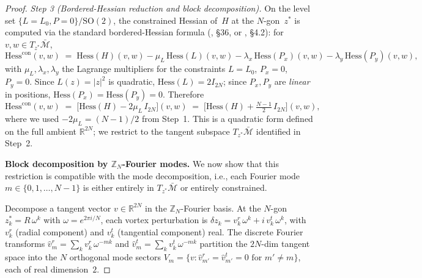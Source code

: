 \begin{proof}
\emph{Step 3 (Bordered-Hessian reduction and block decomposition).}
On the level set $\{L = L_0, P = 0\}/\mathrm{SO}(2)$, the
constrained Hessian of~$H$ at the $N$-gon~$z^*$ is computed via
the standard bordered-Hessian formula (\citealt{Arnold1978},
\S36, or \citealt{MarsdenRatiu1999}, \S4.2): for $v, w \in
T_{z^*}\bar{\mathcal{M}}$,
\begin{equation}\label{eq:bordered-hess}
  \mathrm{Hess}^{\mathrm{con}}(v, w)
  \;=\; \mathrm{Hess}(H)(v, w)
     - \mu_L \,\mathrm{Hess}(L)(v, w)
     - \lambda_x\,\mathrm{Hess}(P_x)(v, w)
     - \lambda_y\,\mathrm{Hess}(P_y)(v, w),
\end{equation}
with $\mu_L, \lambda_x, \lambda_y$ the Lagrange multipliers for
the constraints $L = L_0$, $P_x = 0$, $P_y = 0$.  Since
$L(z) = |z|^2$ is quadratic, $\mathrm{Hess}(L) = 2 I_{2N}$; since
$P_x, P_y$ are \emph{linear} in positions,
$\mathrm{Hess}(P_x) = \mathrm{Hess}(P_y) = 0$.  Therefore
\begin{equation}\label{eq:constrained-hess}
  \mathrm{Hess}^{\mathrm{con}}(v, w)
  \;=\; \bigl[\mathrm{Hess}(H) - 2\mu_L\,I_{2N}\bigr](v, w)
  \;=\; \bigl[\mathrm{Hess}(H) + \tfrac{N-1}{2}\,I_{2N}\bigr](v, w),
\end{equation}
where we used $-2\mu_L = (N-1)/2$ from Step~1.  This is a
quadratic form defined on the full ambient $\mathbb{R}^{2N}$;
we restrict to the tangent subspace $T_{z^*}\bar{\mathcal{M}}$
identified in Step~2.

\textbf{Block decomposition by $\mathbb{Z}_N$-Fourier modes.}
We now show that this restriction is compatible with the
mode decomposition, i.e., each Fourier mode
$m \in \{0, 1, \ldots, N-1\}$ is either entirely in
$T_{z^*}\bar{\mathcal{M}}$ or entirely constrained.

Decompose a tangent vector $v \in \mathbb{R}^{2N}$ in the
$\mathbb{Z}_N$-Fourier basis.  At the $N$-gon
$z_k^* = R\,\omega^k$ with $\omega = e^{2\pi i/N}$, each vortex
perturbation is
$\delta z_k = v_k^r \,\omega^k + i\, v_k^t \,\omega^k$, with
$v_k^r$ (radial component) and $v_k^t$ (tangential component)
real.  The discrete Fourier transforms
$\hat v^r_m = \sum_k v_k^r\,\omega^{-mk}$ and
$\hat v^t_m = \sum_k v_k^t\,\omega^{-mk}$ partition the $2N$-dim
tangent space into the $N$ orthogonal mode sectors
$V_m = \{v : \hat v^r_{m'} = \hat v^t_{m'} = 0 \text{ for }
m' \ne m\}$, each of real dimension~$2$.


\end{proof}
